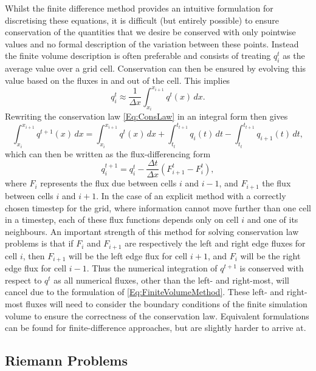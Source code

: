 Whilst the finite difference method provides an intuitive formulation for discretising these equations, it is difficult (but entirely possible) to ensure conservation of the quantities that we desire be conserved with only pointwise values and no formal description of the variation between these points.
Instead the finite volume description is often preferable and consists of treating $q_i^t$ as the average value over a grid cell.
Conservation can then be ensured by evolving this value based on the fluxes in and out of the cell.
This implies
\begin{equation}
    q_i^t \approx \frac{1}{\Delta x}\int_{x_i}^{x_{i+1}} q^t(x)\, dx.
\end{equation}
Rewriting the conservation law \eqref{Eq:ConsLaw} in an integral form then gives
\begin{equation}
    \int_{x_i}^{x_{i+1}} q^{t+1}(x)\, dx = \int_{x_i}^{x_{i+1}} q^{t}(x)\, dx
                                         + \int_{t_t}^{t_{t+1}} q_i(t)\, dt
                                         - \int_{t_t}^{t_{t+1}} q_{i+1}(t)\, dt,
\end{equation}
which can then be written as the flux-differencing form
\begin{equation}\label{Eq:FiniteVolumeMethod}
    q_i^{t+1} = q_i^t - \frac{\Delta t}{\Delta x}\left( F^t_{i+1} - F^t_{i} \right),
\end{equation}
where $F_i$ represents the flux due between cells $i$ and $i-1$, and $F_{i+1}$ the flux between cells $i$ and $i+1$.
In the case of an explicit method with a correctly chosen timestep for the grid, where information cannot move further than one cell in a timestep, each of these flux functions depends only on cell $i$ and one of its neighbours.
An important strength of this method for solving conservation law problems is that if $F_i$ and $F_{i+1}$ are respectively the left and right edge fluxes for cell $i$, then $F_{i+1}$ will be the left edge flux for cell $i+1$, and $F_{i}$ will be the right edge flux for cell $i-1$.
Thus the numerical integration of $q^{t+1}$ is conserved with respect to $q^t$ as all numerical fluxes, other than the left- and right-most, will cancel due to the formulation of \eqref{Eq:FiniteVolumeMethod}.
These left- and right-most fluxes will need to consider the boundary conditions of the finite simulation volume to ensure the correctness of the conservation law.
Equivalent formulations can be found for finite-difference approaches, but are slightly harder to arrive at.


\subsection{Riemann Problems}


